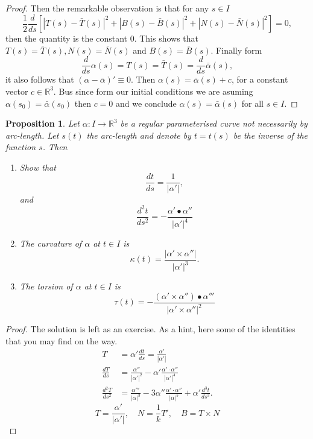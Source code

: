 \documentclass{amsart}
\newtheorem{prop}{Proposition}
\begin{document}
\begin{proof}
Then the remarkable observation is that for any \(s\in I\)
\[ \frac{1}{2}\frac{d}{ds}\left[ |T(s) - \bar{T}(s)|^2 + |B(s) - \bar{B}(s)|^2 + |N(s) - \bar{N}(s)|^2 \right] = 0, \]
then the quantity is the constant \(0\). This shows that \(T(s) = \bar{T}(s), N(s) = \bar{N}(s)\) and \(B(s) = \bar{B}(s)\).
Finally  form
\[ \frac{d}{ds} \alpha(s) = T(s) = \bar{T}(s) = \frac{d}{ds} \bar{\alpha}(s), \]
it also follows that \((\alpha - \bar{\alpha})' \equiv 0\). Then \(\alpha(s) = \bar{\alpha}(s) + c\), for a constant vector \(c\in \mathbb{R}^3\). Bus since form our initial conditions
we are asuming \(\alpha(s_0) = \bar{\alpha}(s_0)\) then \(c=0\) and we conclude \(\alpha(s) = \bar{\alpha}(s)\) for all \(s\in I\).
\end{proof}


\begin{prop}
Let \(\alpha: I \to \mathbb{R}^3\) be a regular parameterised curve not necessarily by arc-length. Let \(s(t)\) the arc-length and denote by  \(t = t(s)\) be the inverse of the function \(s\). Then
\begin{enumerate}
\item Show that \[\frac{dt}{ds} = \frac{1}{|\alpha'|},\] and \[\frac{d^2t}{ds^2} = - \frac{\alpha'\bullet \alpha''}{|\alpha'|^4} \]
\item The curvature of \(\alpha\) at \(t\in I\) is \[ \kappa(t) = \frac{|\alpha' \times \alpha''|}{|\alpha'|^3}. \]
\item The torsion of \(\alpha\) at \(t \in I\) is \[ \tau(t) = -\frac{(\alpha' \times \alpha'')\bullet \alpha'''}{|\alpha' \times \alpha ''|^2} \]
\end{enumerate}
\end{prop}
\begin{proof}
The solution is left as an exercise. As a hint, here some of the identities that you may find on the way.
\begin{equation} \begin{split} T &=
\alpha' \frac{dt}{ds} =
\frac{\alpha'}{|\alpha'|}\\ \frac{dT}{ds}&=\frac{\alpha''}{|\alpha'|^2} -
\alpha' \frac{\alpha'\cdot\alpha''}{|\alpha'|^4}\\ \frac{d^2T}{ds^2}&=
\frac{\alpha'''}{|\alpha|^3} -
3\alpha''\frac{\alpha'\cdot\alpha''}{|\alpha|^5} +
\alpha'\frac{d^3t}{ds^3}. \end{split}
\end{equation} \begin{equation} T = \frac{\alpha'}{|\alpha'|},
\quad N = \frac{1}{k}T' , \quad B = T\times N
\end{equation} 
\end{proof}
\end{document}
